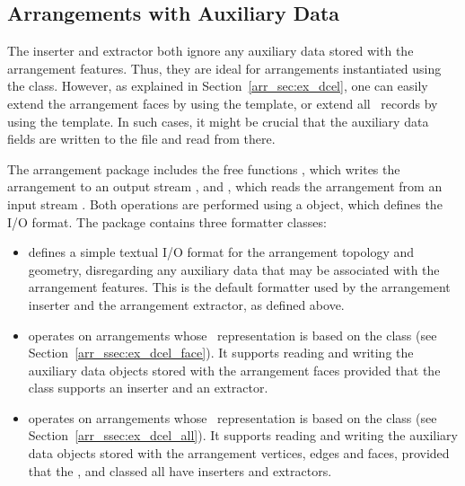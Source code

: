
\begin{ccAdvanced}
\subsection{Arrangements with Auxiliary Data\label{arr_ssec:arr_io_aux_data}}

The inserter and extractor both ignore any auxiliary data stored with
the arrangement features. Thus, they are ideal for arrangements
instantiated using the  class.
However, as explained in Section~\ref{arr_sec:ex_dcel}, one can easily
extend the arrangement faces by using the 
template, or extend all \dcel\ records by using the 
template. In such cases, it might be crucial that the auxiliary data fields
are written to the file and read from there.

The arrangement package includes the free functions
, which writes the arrangement 
to an output stream , and , which
reads the arrangement  from an input stream . Both
operations are performed using a  object, which defines
the I/O format. The package contains three formatter classes:
\begin{itemize}
\item {} defines a simple textual
I/O format for the arrangement topology and geometry, disregarding any
auxiliary data that may be associated with the arrangement features.
This is the default formatter used by the arrangement inserter and the
arrangement extractor, as defined above.
%
\item {} operates on
arrangements whose \dcel\ representation is based on the
 class (see
Section~\ref{arr_ssec:ex_dcel_face}). It supports reading and writing
the auxiliary data objects stored with the arrangement faces provided
that the  class supports an inserter and an extractor.
%
\item {} operates on
arrangements whose \dcel\ representation is based on the
 class
(see Section~\ref{arr_ssec:ex_dcel_all}). It supports reading and writing
the auxiliary data objects stored with the arrangement vertices, edges
and faces, provided that the ,  and
 classed all have inserters and extractors.
\end{itemize}


\end{ccAdvanced}
